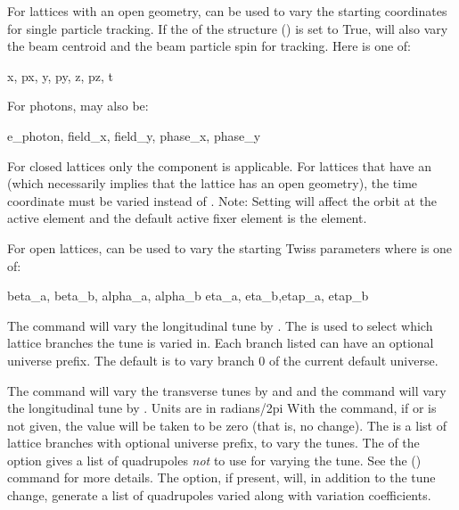 For lattices with an open geometry,  can be used to
vary the starting coordinates for single particle tracking. If the  of the
 structure () is set to True,  will also vary the
beam centroid and the beam particle spin for tracking. Here  is one of:
\begin{example}
  x, px, y, py, z, pz, t
\end{example}
For photons,  may also be:
\begin{example}
  e_photon, field_x, field_y, phase_x, phase_y
\end{example}
For closed lattices only the  component is applicable. For lattices that have an 
(which necessarily implies that the lattice has an open geometry), the time  coordinate must
be varied instead of .
Note: Setting  will affect the orbit at the active  element and the 
default active fixer element is the  element.

For open lattices,  can be used to vary the starting Twiss
parameters where  is one of:
\begin{example}
  beta_a, beta_b, alpha_a, alpha_b 
  eta_a, eta_b,etap_a, etap_b    
\end{example}

The  command will vary the longitudinal tune by . The 
is used to select which lattice branches the tune is varied in. Each branch listed can have an
optional universe prefix. The default is to vary branch 0 of the current default universe.

The  command will vary the transverse tunes by  and  and 
the  command will vary the longitudinal tune by . Units are in radians/2pi
With the  command, if  or  is not given, the value will
be taken to be zero (that is, no change). The  is a list of lattice
branches with optional universe prefix, to vary the tunes. The  of the 
option gives a list of quadrupoles {\em not} to use for varying the tune. See the 
() command for more details. The  option, if present, will, in
addition to the tune change, generate a list of quadrupoles varied along with variation
coefficients.

